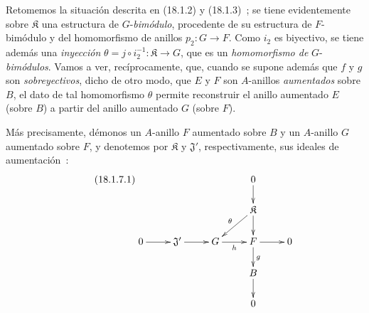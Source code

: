 \begin{env}[18.1.7]
\label{0.18.1.7-fr}
Retomemos la situación descrita en (18.1.2) y (18.1.3)~; se tiene evidentemente sobre
$\mathfrak{K}$ una estructura de $G$-\emph{bimódulo}, procedente de su estructura de
$F$-bimódulo y del homomorfismo de anillos $p_2:G\to F$. Como $i_2$ es
biyectivo, se tiene además una \emph{inyección}
$\theta=j\circ i_2^{-1}:\mathfrak{K}\to G$, que es un \emph{homomorfismo de}
$G$-\emph{bimódulos}. Vamos a ver, recíprocamente, que, cuando se supone además
que $f$ y $g$ son \emph{sobreyectivos}, dicho de otro modo, que $E$ y $F$ son
$A$-anillos \emph{aumentados} sobre $B$, el dato de tal homomorfismo
$\theta$ permite reconstruir el anillo aumentado $E$ (sobre $B$) a partir del
anillo aumentado $G$ (sobre $F$).

Más precisamente, démonos un $A$-anillo $F$ aumentado sobre $B$ y un
$A$-anillo $G$ aumentado sobre $F$, y denotemos por $\mathfrak{K}$ y
$\mathfrak{J}'$, respectivamente, sus ideales de aumentación~:
\begin{equation}
\label{0.18.1.7.1-fr}
\tag{18.1.7.1}
  \xymatrix@C=2pc@R=1.5pc{
    & & & 0\ar[d] & \\
    & & & \mathfrak{K}\ar[ld]_\theta\ar[d] & \\
    0\ar[r] & \mathfrak{J}'\ar[r] & G\ar[r]_h & F\ar[r]\ar[d]^g & 0\\
    & & & B\ar[d] & \\
    & & & 0 &
  }
\end{equation}


\end{env}
